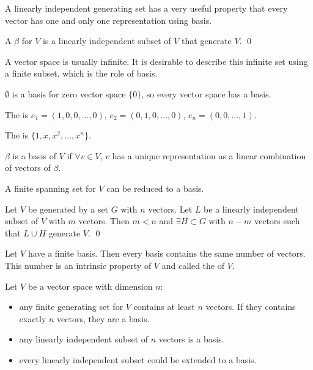 A linearly independent generating set has a very useful property that every vector has one and only one representation using basis.

\begin{definition}
	A  $\beta$ for $V$ is a linearly independent subset of $V$ that generate $V$. 
	\qed
\end{definition}

A vector space is usually infinite. It is desirable to describe this infinite set using a finite subset, which is  the role of basis.

\begin{theorem}
    $\emptyset$ is a basis for zero vector space $\{0\}$, so every vector space has a basis.
\end{theorem}

\begin{definition}
    The  is $e_1=(1,0,0,\dots,0)$, $e_2=(0,1,0,\dots,0)$, $e_n=(0,0,\dots,1)$.
\end{definition}

\begin{definition}
    The  is $\{1,x,x^2,\dots,x^n\}$.
\end{definition}


\begin{theorem}
	$\beta$ is a basis of $V$ if $\forall v \in V $, $v$ has a unique representation as a linear combination of vectors of $\beta$.
\end{theorem}

\begin{theorem}
    A finite spanning set for $V$ can be reduced to a basis.    
\end{theorem}


\begin{theorem}
	Let $V$ be generated by a set $G$ with $n$ vectors. Let $L$ be a linearly independent subset of $V$ with $m$ vectors. Then $m < n$ and $\exists H \subset G$ with $n-m$ vectors such that $L \cup H$ generate $V$.
	\qed
\end{theorem}

\begin{theorem}
    Let $V$ have a finite basis. Then every basis contains the same number of vectors. This number is an intrinsic property of $V$ and called the  of $V$.    
\end{theorem}

\begin{theorem}
    Let $V$ be a vector space with dimension $n$:
    \begin{itemize}
        \item any finite generating set for $V$ contains at least $n$ vectors. If they contains exactly $n$ vectors, they are a basis.
        \item any linearly independent subset of $n$ vectors is a basis.
        \item every linearly independent subset could be extended to a basis.
    \end{itemize}    
\end{theorem}




